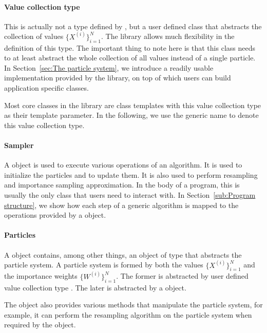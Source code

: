 \paragraph{Value collection type}

This is actually not a type defined by \vsmc, but a user defined class that abstracts the collection of values $\{X^{(i)}\}_{i=1}^N$. The library allows much flexibility in the definition of this type. The important thing to note here is that this class needs to at least abstract the whole collection of all values instead of a single particle. In Section~\ref{sec:The particle system}, we introduce a readily usable implementation provided by the \vsmc library, on top of which users can build application specific classes.

Most core classes in the library are class templates with this value collection type as their template parameter. In the following, we use the generic name  to denote this value collection type.

\paragraph{Sampler}

A  object is used to execute various operations of an \smc algorithm. It is used to initialize the particles and to update them. It is also used to perform resampling and importance sampling approximation. In the body of a program, this is usually the only class that users need to interact with. In Section~\ref{sub:Program structure}, we show how each step of a generic \smc algorithm is mapped to the operations provided by a  object.

\paragraph{Particles}

A  object contains, among other things, an object of type  that abstracts the particle system. A particle system is formed by both the values $\{X^{(i)}\}_{i=1}^N$ and the importance weights $\{W^{(i)}\}_{i=1}^N$. The former is abstracted by user defined value collection type . The later is abstracted by a  object.

The  object also provides various methods that manipulate the particle system, for example, it can perform the resampling algorithm on the particle system when required by the  object.

